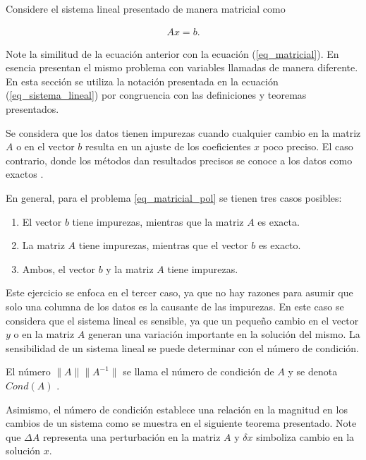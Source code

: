 Considere el sistema lineal presentado de manera matricial como 

\begin{equation}  \label{eq_sistema_lineal}
	\begin{aligned}
		Ax = b.
	\end{aligned}
\end{equation} 

Note la similitud de la ecuación anterior con la ecuación (\ref{eq_matricial}). En esencia presentan el mismo problema con variables llamadas de manera diferente. En esta sección se utiliza la notación presentada en la ecuación (\ref{eq_sistema_lineal}) por congruencia con las definiciones y teoremas presentados. 

Se considera que los datos tienen impurezas cuando cualquier cambio en la matriz $A$ o en el vector $b$ resulta en un ajuste de los coeficientes $x$ poco preciso. El caso contrario, donde los métodos dan resultados precisos se conoce a los datos como exactos \citep{numerical_linear_algebra}.

En general, para el problema \ref{eq_matricial_pol} se tienen tres casos posibles: 
\begin{enumerate}
	\item El vector $b$ tiene impurezas, mientras que la matriz $A$ es exacta. 
	\item La matriz $A$ tiene impurezas, mientras que el vector $b$ es exacto.
	\item Ambos, el vector $b$ y la matriz $A$ tiene impurezas. 
\end{enumerate}

Este ejercicio se enfoca en el tercer caso, ya que no hay razones para asumir que solo una columna de los datos es la causante de las impurezas. En este caso se considera que el sistema lineal es sensible, ya que un pequeño cambio en el vector $y$ o en la matriz $A$ generan una variación importante en la solución del mismo. La sensibilidad de un sistema lineal se puede determinar con el número de condición. 

\begin{definition}
	El número $\parallel A \parallel  \parallel A^{-1} \parallel$ se llama el número de condición de $A$ y se denota $Cond(A)$ \cite[p.~62]{numerical_linear_algebra}. 
\end{definition}

Asimismo, el número de condición establece una relación en la magnitud en los cambios de un sistema como se muestra en el siguiente teorema presentado. Note que $\Delta A$ representa una perturbación en la matriz $A$ y $\delta x$ simboliza cambio en la solución $x$. 


